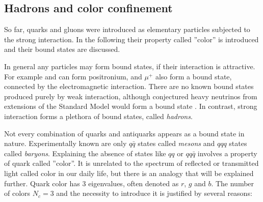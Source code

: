 \subsection{Hadrons and color confinement} \label{sec:confinement}

So far, quarks and gluons were introduced as elementary particles subjected to the
strong interaction. In the following their property called ''color'' is introduced
and their bound states are discussed.

In general any particles may form bound states, if their interaction is
attractive.  For example \Pelectron and \Ppositron can form positronium,
\Pelectron and $\mu^+$ also form a bound state, connected by the electromagnetic
interaction. There are no known bound states produced purely by weak
interaction, although conjectured heavy neutrinos from extensions of the
Standard Model would form a bound state \cite{Dmitriev:2012ha}.
In contrast, strong interaction forms a plethora of bound states, called
\emph{hadrons}.

Not every combination of quarks and antiquarks appears as a bound state in
nature. Experimentally known are only $q\bar{q}$ states called \emph{mesons} and $qqq$
states called \emph{baryons}. Explaining the absence of states like $qq$ or $qq\bar{q}$
involves a property of quark called ''color''. It is unrelated
to the spectrum of reflected or transmitted light called color in our daily
life, but there is an analogy that will be explained further. Quark color has 3
eigenvalues, often denoted as $r$, $g$ and $b$. The number of colors $N_c = 3$
and the necessity to introduce it is justified by several reasons:

